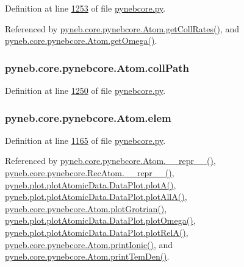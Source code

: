 Definition at line \hyperlink{pynebcore_8py_source_l01253}{1253} of file \hyperlink{pynebcore_8py_source}{pynebcore.\+py}.



Referenced by \hyperlink{pynebcore_8py_source_l01329}{pyneb.\+core.\+pynebcore.\+Atom.\+get\+Coll\+Rates()}, and \hyperlink{pynebcore_8py_source_l01262}{pyneb.\+core.\+pynebcore.\+Atom.\+get\+Omega()}.

\hypertarget{classpyneb_1_1core_1_1pynebcore_1_1_atom_a7afd231b8a40f04aff5d61b8cc20c387}{}
\subsubsection[{coll\+Path}]{\setlength{\rightskip}{0pt plus 5cm}pyneb.\+core.\+pynebcore.\+Atom.\+coll\+Path}\label{classpyneb_1_1core_1_1pynebcore_1_1_atom_a7afd231b8a40f04aff5d61b8cc20c387}


Definition at line \hyperlink{pynebcore_8py_source_l01250}{1250} of file \hyperlink{pynebcore_8py_source}{pynebcore.\+py}.

\hypertarget{classpyneb_1_1core_1_1pynebcore_1_1_atom_ae722bd0e35e1c8cdc0018d56c34171cf}{}
\subsubsection[{elem}]{\setlength{\rightskip}{0pt plus 5cm}pyneb.\+core.\+pynebcore.\+Atom.\+elem}\label{classpyneb_1_1core_1_1pynebcore_1_1_atom_ae722bd0e35e1c8cdc0018d56c34171cf}


Definition at line \hyperlink{pynebcore_8py_source_l01165}{1165} of file \hyperlink{pynebcore_8py_source}{pynebcore.\+py}.



Referenced by \hyperlink{pynebcore_8py_source_l02544}{pyneb.\+core.\+pynebcore.\+Atom.\+\_\+\+\_\+repr\+\_\+\+\_\+()}, \hyperlink{pynebcore_8py_source_l03032}{pyneb.\+core.\+pynebcore.\+Rec\+Atom.\+\_\+\+\_\+repr\+\_\+\+\_\+()}, \hyperlink{plot_atomic_data_8py_source_l00116}{pyneb.\+plot.\+plot\+Atomic\+Data.\+Data\+Plot.\+plot\+A()}, \hyperlink{plot_atomic_data_8py_source_l00188}{pyneb.\+plot.\+plot\+Atomic\+Data.\+Data\+Plot.\+plot\+All\+A()}, \hyperlink{pynebcore_8py_source_l02372}{pyneb.\+core.\+pynebcore.\+Atom.\+plot\+Grotrian()}, \hyperlink{plot_atomic_data_8py_source_l00372}{pyneb.\+plot.\+plot\+Atomic\+Data.\+Data\+Plot.\+plot\+Omega()}, \hyperlink{plot_atomic_data_8py_source_l00261}{pyneb.\+plot.\+plot\+Atomic\+Data.\+Data\+Plot.\+plot\+Rel\+A()}, \hyperlink{pynebcore_8py_source_l02167}{pyneb.\+core.\+pynebcore.\+Atom.\+print\+Ionic()}, and \hyperlink{pynebcore_8py_source_l02253}{pyneb.\+core.\+pynebcore.\+Atom.\+print\+Tem\+Den()}.

